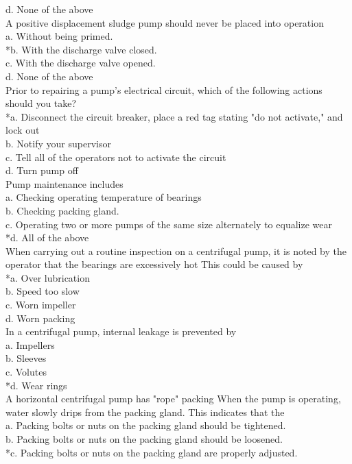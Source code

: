 d. None of the above \\
 A positive displacement sludge pump should never be placed into operation \\
a. Without being primed. \\
*b. With the discharge valve closed. \\
c. With the discharge valve opened. \\
d. None of the above \\
 Prior to repairing a pump's electrical circuit, which of the following actions should you take? \\
*a. Disconnect the circuit breaker, place a red tag stating "do not activate," and lock out \\
b. Notify your supervisor \\
c. Tell all of the operators not to activate the circuit \\
d. Turn pump off \\
 Pump maintenance includes \\
a. Checking operating temperature of bearings \\
b. Checking packing gland. \\
c. Operating two or more pumps of the same size alternately to equalize wear \\
*d. All of the above \\
 When carrying out a routine inspection on a centrifugal pump, it is noted by the operator that the bearings are excessively hot This could be caused by \\
*a. Over lubrication \\
b. Speed too slow \\
c. Worn impeller \\
d. Worn packing \\
 In a centrifugal pump, internal leakage is prevented by \\
a. Impellers \\
b. Sleeves \\
c. Volutes \\
*d. Wear rings \\
 A horizontal centrifugal pump has "rope" packing When the pump is operating, water slowly drips from the packing gland. This indicates that the \\
a. Packing bolts or nuts on the packing gland should be tightened. \\
b. Packing bolts or nuts on the packing gland should be loosened. \\
*c. Packing bolts or nuts on the packing gland are properly adjusted. \\
